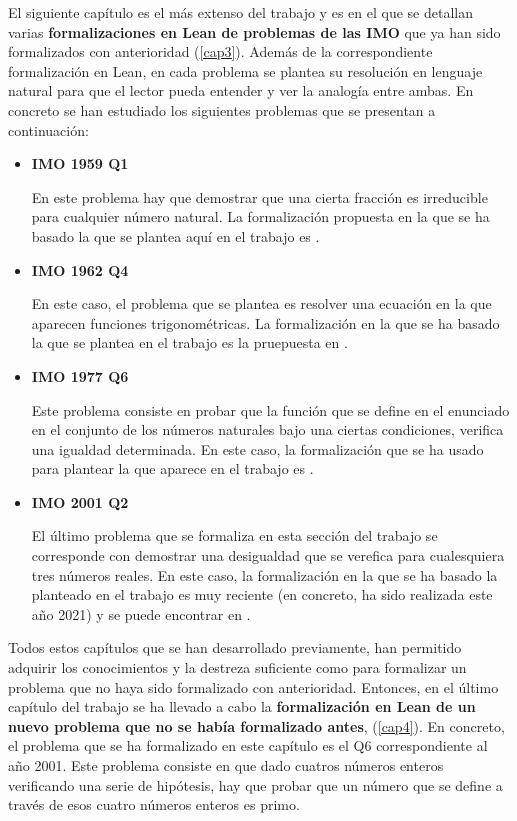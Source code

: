 El siguiente capítulo es el más extenso del trabajo y es en el que se detallan
varias \textbf{formalizaciones en Lean de problemas de las IMO} que ya han sido
formalizados con anterioridad (\ref{cap3}). Además de la correspondiente formalización en
Lean, en cada problema se plantea su resolución en lenguaje natural para que
el lector pueda entender y ver la analogía entre ambas. En concreto se han
estudiado los siguientes problemas que se presentan a continuación:
\begin{itemize}
\item \textbf{IMO 1959 Q1}

  En este problema hay que demostrar que una cierta fracción es irreducible
  para cualquier número natural. La formalización propuesta en la que se ha
  basado la que se plantea aquí en el trabajo es \cite{KL}.

\item \textbf{IMO 1962 Q4}

  En este caso, el problema que se plantea es resolver una ecuación en la que
  aparecen funciones trigonométricas. La formalización en la que se ha basado
  la que se plantea en el trabajo es la pruepuesta en \cite{KLHM}.

\item \textbf{IMO 1977 Q6}

  Este problema consiste en probar que la función que se define en el enunciado
  en el conjunto de los números naturales bajo una ciertas condiciones, verifica
  una igualdad determinada. En este caso, la formalización que se ha usado
  para plantear la que aparece en el trabajo es \cite{TC}.


\item \textbf{IMO 2001 Q2}

  El último problema que se formaliza en esta sección del trabajo se corresponde
  con demostrar una desigualdad que se verefica para cualesquiera tres números
  reales. En este caso, la formalización en la que se ha basado la planteado
  en el trabajo es muy reciente (en concreto, ha sido realizada este año 2021)
  y se puede encontrar en \cite{TCC}. 
\end{itemize}

Todos estos capítulos que se han desarrollado previamente, han permitido
adquirir los conocimientos y la destreza suficiente como para formalizar un
problema que no haya sido formalizado con anterioridad. Entonces, en el último
capítulo del trabajo se ha llevado a cabo la \textbf{
formalización en Lean de un nuevo problema que no se había formalizado antes},
(\ref{cap4}). En concreto, el problema que se ha formalizado en este capítulo es
el Q6 correspondiente al año 2001. Este problema consiste en que dado cuatros
números enteros verificando una serie de hipótesis, hay que probar que un
número que se define a través de esos cuatro números enteros es primo.

